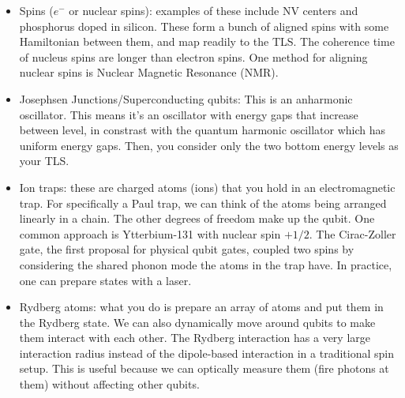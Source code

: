 \begin{itemize}
    \item Spins ($e^{-}$ or nuclear spins): examples of these include NV centers and phosphorus doped in silicon. These form a bunch of aligned spins
    with some Hamiltonian between them, and map readily to the TLS. The coherence time of nucleus spins are longer than electron spins. One method for aligning nuclear spins is Nuclear Magnetic Resonance (NMR).
    \item Josephsen Junctions/Superconducting qubits: This is an anharmonic oscillator. This means it's an oscillator with energy gaps that increase between level, in constrast with the quantum harmonic oscillator
    which has uniform energy gaps. Then, you consider only the two bottom energy levels as your TLS.
    \item Ion traps: these are charged atoms (ions) that you hold in an electromagnetic trap. For specifically a Paul trap, we can
    think of the atoms being arranged linearly in a chain. The other degrees of freedom make up the qubit.
    One common approach is Ytterbium-131 with nuclear spin $+1/2$. The Cirac-Zoller gate, the first proposal for physical qubit gates,
    coupled two spins by considering the shared phonon mode the atoms in the trap have. In practice, one can prepare states with a laser.
    \item Rydberg atoms: what you do is prepare an array of atoms and put them in the Rydberg state. We can also dynamically move around qubits to make them interact with each other.
    The Rydberg interaction has a very large interaction radius instead of the dipole-based interaction in a traditional spin setup. This is useful because
    we can optically measure them (fire photons at them) without affecting other qubits.
\end{itemize}

